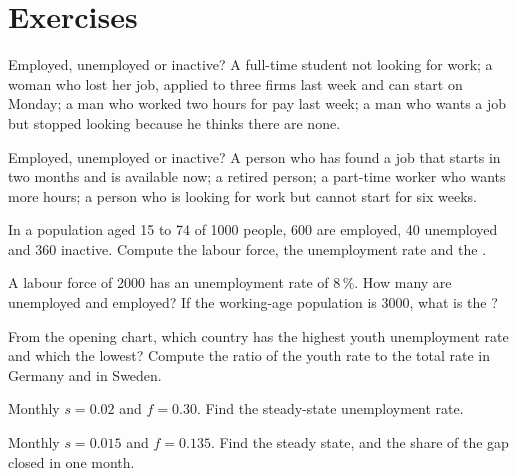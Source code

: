 \section{Exercises}

\begin{exercise}[$\star$]\label{exo:g11:unemployment:1}
Employed, unemployed or inactive? A full-time student not looking for work; a woman who lost her job, applied to three firms last week and can start on Monday; a man who
worked two hours for pay last week; a man who wants a job but stopped looking because he thinks there are none.
\end{exercise}

\begin{exercise}[$\star$]\label{exo:g11:unemployment:2}
Employed, unemployed or inactive? A person who has found a job that starts in two months and is available now; a retired person; a part-time worker who wants more hours;
a person who is looking for work but cannot start for six weeks.
\end{exercise}

\begin{exercise}[$\star$]\label{exo:g11:unemployment:3}
In a population aged 15 to 74 of 1000 people, 600 are employed, 40 unemployed and 360 inactive. Compute the labour force, the unemployment rate and the .
\end{exercise}

\begin{exercise}[$\star$]\label{exo:g11:unemployment:4}
A labour force of 2000 has an unemployment rate of 8\,\%. How many are unemployed and employed? If the working-age population is 3000, what is the ?
\end{exercise}

\begin{exercise}[$\star$]\label{exo:g11:unemployment:5}
From the opening chart, which country has the highest youth unemployment rate and which the lowest? Compute the ratio of the youth rate to the total rate in Germany and in
Sweden.
\end{exercise}

\begin{exercise}[$\star\star$]\label{exo:g11:unemployment:6}
Monthly $s = 0.02$ and $f = 0.30$. Find the steady-state unemployment rate.
\end{exercise}

\begin{exercise}[$\star\star$]\label{exo:g11:unemployment:7}
Monthly $s = 0.015$ and $f = 0.135$. Find the steady state, and the share of the gap closed in one month.
\end{exercise}


